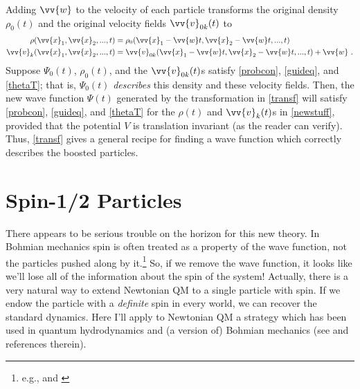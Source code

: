 \documentclass[onecolumn,secnumarabic,balancelastpage,amsmath,amssymb,nofootinbib]{article}
\begin{document}
Adding $\vv{w}$ to the velocity of each particle transforms the original density $\rho_0(t)$ and the original velocity fields $\vv{v}_{0k}(t)$ to
\begin{align}
\rho(\vv{x}_1,\vv{x}_2,...,t) &= \rho_0(\vv{x}_1-\vv{w}t,\vv{x}_2-\vv{w}t,...,t)
\nonumber
\\
\vv{v}_{k}(\vv{x}_1,\vv{x}_2,...,t) &= \vv{v}_{0k}(\vv{x}_1-\vv{w}t,\vv{x}_2-\vv{w}t,...,t)+\vv{w}\ .
\label{newstuff}
\end{align}
Suppose $\Psi_0(t)$, $\rho_0(t)$, and the $\vv{v}_{0k}(t)$s satisfy \eqref{probcon}, \eqref{guideq}, and \eqref{thetaT}; that is, $\Psi_0(t)$ \emph{describes} this density and these velocity fields.  Then, the new wave function $\Psi(t)$ generated by the transformation in \eqref{transf} will satisfy \eqref{probcon}, \eqref{guideq}, and \eqref{thetaT} for the $\rho(t)$ and $\vv{v}_k(t)$s in \eqref{newstuff}, provided that the potential $V$ is translation invariant (as the reader can verify).  Thus, \eqref{transf} gives a general recipe for finding a wave function which correctly describes the boosted particles.

\section{Spin-1/2 Particles}\label{withspin}

There appears to be serious trouble on the horizon for this new theory.  In Bohmian mechanics spin is often treated as a property of the wave function, not the particles pushed along by it.\footnote{e.g., \citet[]{durr2009} and \citet[ch. 7]{albert1994}}  So, if we remove the wave function, it looks like we'll lose all of the information about the spin of the system!  Actually, there is a very natural way to extend Newtonian QM to a single particle with spin.  If we endow the particle with a \emph{definite} spin in every world, we can recover the standard dynamics.  Here I'll apply to Newtonian QM a strategy which has been used in quantum hydrodynamics and (a version of) Bohmian mechanics (see \citealp[][ch. 9]{holland} and references therein).
\end{document}
